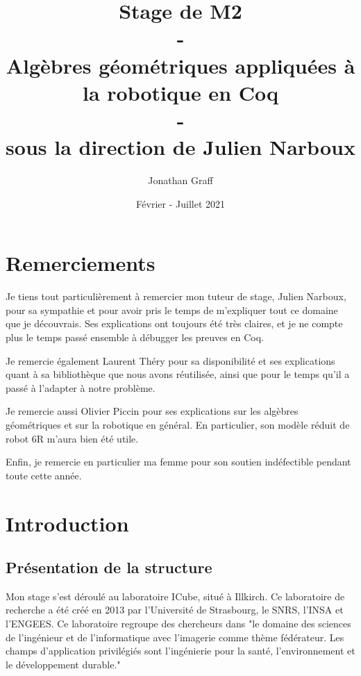 
\let\oldref\ref
\renewcommand{\ref}[1]{(\oldref{#1})}
\renewcommand{\thesection}{\Roman{section})}
\renewcommand{\thesubsection}{\Roman{section}.\arabic{subsection})}
\renewcommand{\contentsname}{Sommaire}
\renewcommand{\bibname}{Bibliographie}
\title{Stage de M2 \\ - \\ Algèbres géométriques appliquées à la robotique en Coq\\ - \\ sous la direction de Julien Narboux }
\author{Jonathan Graff}
\date{Février - Juillet 2021}
\maketitle
\tableofcontents
\newpage

\section*{Remerciements}

Je tiens tout particulièrement à remercier mon tuteur de stage, Julien Narboux, pour sa sympathie et pour avoir pris le temps de m'expliquer tout ce domaine que je découvrais. Ses explications ont toujours été très claires, et je ne compte plus le temps passé ensemble à débugger les preuves en Coq.

Je remercie également Laurent Théry pour sa disponibilité et ses explications quant à sa bibliothèque que nous avons réutilisée, ainsi que pour le temps qu'il a passé à l'adapter à notre problème. 

Je remercie aussi Olivier Piccin pour ses explications sur les algèbres géométriques et sur la robotique en général. En particulier, son modèle réduit de robot 6R m'aura bien été utile. 

Enfin, je remercie en particulier ma femme pour son soutien indéfectible pendant toute cette année.

\newpage
\section{Introduction}
\subsection{Présentation de la structure}

Mon stage s'est déroulé au laboratoire ICube, situé à Illkirch. Ce laboratoire de recherche a été créé en 2013 par l'Université de Strasbourg, le SNRS, l'INSA et l'ENGEES.
Ce laboratoire regroupe des chercheurs dans "le domaine des sciences de l'ingénieur et de l'informatique avec l'imagerie comme thème fédérateur. Les champs d'application privilégiés sont l'ingénierie pour la santé, l'environnement et le développement durable."\cite{icube}

